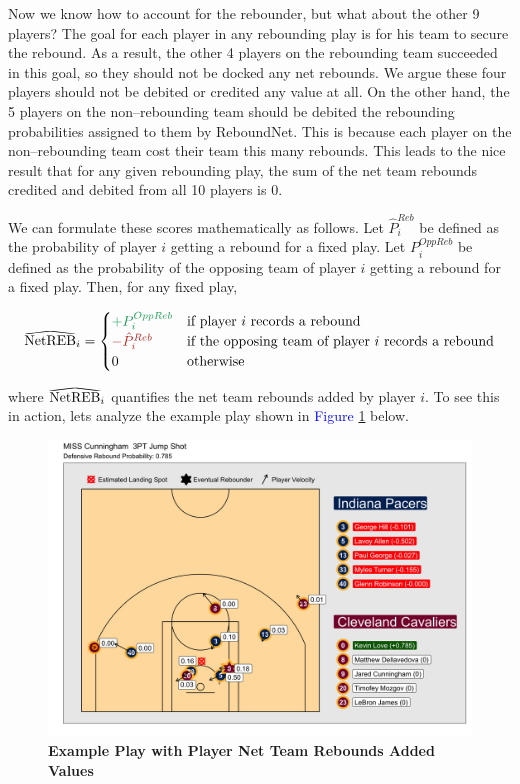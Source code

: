 \documentclass{article}
\newcommand\reallywidehat[1]{%
\savestack{\tmpbox}{\stretchto{%
  \scaleto{%
    \scalerel*[\widthof{\ensuremath{#1}}]{\kern-.6pt\bigwedge\kern-.6pt}%
    {\rule[-\textheight/2]{1ex}{\textheight}}%
  }{\textheight}%
}{0.5ex}}%
\stackon[1pt]{#1}{\tmpbox}%
}
\begin{document}
\bigbreak
\noindent
Now we know how to account for the rebounder, but what about the other 9 players? The goal for each player in any rebounding play is for his team to secure the rebound. As a result, the other 4 players on the rebounding team succeeded in this goal, so they should not be docked any net rebounds. We argue these four players should not be debited or credited any value at all. On the other hand, the 5 players on the non--rebounding team should be debited the rebounding probabilities assigned to them by ReboundNet. This is because each player on the non--rebounding team cost their team this many rebounds. This leads to the nice result that for any given rebounding play, the sum of the net team rebounds credited and debited from all 10 players is 0.

\clearpage
\noindent
We can formulate these scores mathematically as follows. Let $\hat{P}^{Reb}_{i}$ be defined as the probability of player $i$ getting a rebound for a fixed play. Let $P^{OppReb}_{i}$ be defined as the probability of the opposing team of player $i$ getting a rebound for a fixed play. Then, for any fixed play, 

$$
  \reallywidehat{\text{NetREB}}_{i} =
    \begin{cases}
      \color{ForestGreen} +P^{OppReb}_{i} & \text{if player $i$ records a rebound}\\
      \color{BrickRed} -\hat{P}^{Reb}_{i} & \text{if the opposing team of player $i$ records a rebound}\\
      0 & \text{otherwise}
    \end{cases}       
$$

\noindent
where $\reallywidehat{\text{NetREB}}_{i}$ quantifies the net team rebounds added by player $i$. To see this in action, lets analyze the example play shown in \textcolor{blue}{Figure} \ref{fig:KLoveGoodPlayWithScores} below. 

\begin{figure}[htb]
\centering
\includegraphics[width=1\columnwidth]{KLoveGoodPlayWithScores.png}
\caption{\bf{Example Play with Player Net Team Rebounds Added Values}}
\label{fig:KLoveGoodPlayWithScores}
\end{figure}
\end{document}
